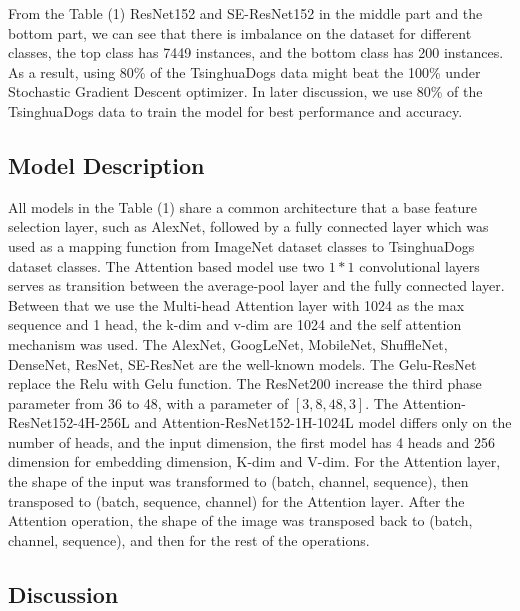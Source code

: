 \documentclass[runningheads]{llncs}
\begin{document}
From the Table (1) ResNet152 and SE-ResNet152 in the middle part and the bottom part, we can see that there is imbalance on the dataset for different classes, the top class has 7449 instances,
and the bottom class has 200 instances. As a result, using 80\% of the TsinghuaDogs data might beat the 100\% under Stochastic Gradient Descent optimizer.
In later discussion, we use 80\% of the TsinghuaDogs data to train the model for best performance and accuracy.

\subsection{Model Description}

All models in the Table (1) share a common architecture that a base feature selection layer, such as AlexNet, followed by a fully connected layer which was used as a mapping function from ImageNet dataset classes to TsinghuaDogs dataset classes.
The Attention based model use two $1*1$ convolutional layers serves as transition between the average-pool layer and the fully connected layer.
Between that we use the Multi-head Attention layer with 1024 as the max sequence and 1 head, the k-dim and v-dim are 1024 and the self attention mechanism was used.
The AlexNet, GoogLeNet, MobileNet, ShuffleNet, DenseNet, ResNet, SE-ResNet are the well-known models. The Gelu-ResNet replace the Relu with Gelu function.
The ResNet200 increase the third phase parameter from 36 to 48, with a parameter of $[3,8,48,3]$.
The Attention-ResNet152-4H-256L and Attention-ResNet152-1H-1024L model differs only on the number of heads, and the input dimension, the first model has 4 heads and 256 dimension for embedding dimension, K-dim and V-dim.
For the Attention layer, the shape of the input was transformed to (batch, channel, sequence), then transposed to (batch, sequence, channel) for the Attention layer.
After the Attention operation, the shape of the image was transposed back to (batch, channel, sequence), and then for the rest of the operations.

\subsection{Discussion}
\end{document}
